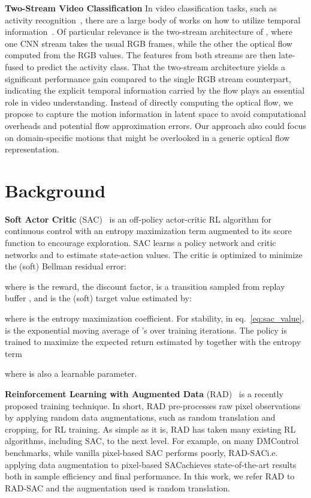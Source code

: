 \documentclass{article} \usepackage{iclr2021_conference,times}
\begin{document}
\textbf{Two-Stream Video Classification} In video classification tasks, such as activity recognition~\citep{soomro2012ucf101}, there are a large body of works on how to utilize temporal information~\citep{donahue2015long, ji20123d, tran2015learning, carreira2017quo, wang2018non, feichtenhofer2019slowfast}. Of particular relevance is the two-stream architecture of \citet{simonyan2014two}, where one CNN stream takes the usual RGB frames, while the other the optical flow computed from the RGB values. The features from both streams are then late-fused to predict the activity class. That the two-stream architecture yields a significant performance gain compared to the single RGB stream counterpart, indicating the explicit temporal information carried by the flow plays an essential role in video understanding. Instead of directly computing the optical ﬂow, we propose to capture the motion information in latent space to avoid computational overheads and potential flow approximation errors. Our approach also could focus on domain-speciﬁc motions that might be overlooked in a generic optical ﬂow representation.




%
 \iffalse
\section{Background}\label{sec:background}


    \textbf{Soft Actor Critic} (SAC)~\citep{haarnoja2018soft} is an off-policy actor-critic RL algorithm for continuous control with an entropy maximization term augmented to its score function to encourage exploration. SAC learns a policy network  and critic networks  and  to estimate state-action values. 
The critic  is optimized to minimize the (soft) Bellman residual error:
    
    where  is the reward,  the discount factor,  is a transition sampled from replay buffer , and  is the (soft) target value estimated by:
    
    where  is the entropy maximization coefficient. 
For stability, in eq.~\ref{eq:sac_value},  is the exponential moving average of 's over training iterations.  The policy  is trained to maximize the expected return estimated by  together with the entropy term

    where  is also a learnable parameter. 


\textbf{Reinforcement Learning with Augmented Data} (RAD)~\citep{laskin_lee2020rad} is a recently proposed training technique. In short, RAD pre-processes raw pixel observations by applying random data augmentations, such as random translation and cropping, for RL training.
As simple as it is, RAD has taken many existing RL algorithms, including SAC, to the next level. 
For example, on many DMControl~\citep{tassa2018deepmind} benchmarks, while vanilla pixel-based SAC performs poorly, RAD-SAC\textemdash i.e. applying data augmentation to pixel-based SAC\textemdash achieves state-of-the-art results both in sample efficiency and final performance. 
In this work, we refer RAD to RAD-SAC and the augmentation used is random translation. 
\end{document}
